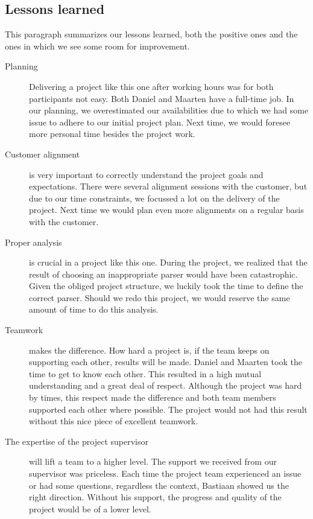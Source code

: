 
\subsection{Lessons learned}
\label{assessment:lessons-learned}
This paragraph summarizes our lessons learned, both the positive ones and the ones in which we see some room for improvement.

  \begin{description}	  
    \item[Planning] Delivering a project like this one after working hours was for both participants not easy. 
	  Both Daniel and Maarten have a full-time job.
	  In our planning, we overestimated our availabilities due to which we had some issue to adhere to our initial project plan.
	  Next time, we would foresee more personal time besides the project work.
	
    \item[Customer alignment] is very important to correctly understand the project goals and expectations.
	  There were several alignment sessions with the customer, but due to our time constraints, we focussed  a lot on the delivery of the project. 
	  Next time we would plan even more alignments on a regular basis with the customer.	  
    
    \item[Proper analysis] is crucial in a project like this one.
	  During the project, we realized that the result of choosing an inappropriate parser would have been catastrophic.
	  Given the obliged project structure, we luckily took the time to define the correct parser.
      Should we redo this project, we would reserve the same amount of time to do this analysis.
    
    \item[Teamwork] makes the difference.
	  How hard a project is, if the team keeps on supporting each other, results will be made.
	  Daniel and Maarten took the time to get to know each other.
	  This resulted in a high mutual understanding and a great deal of respect.
	  Although the project was hard by times, this respect made the difference and both team members supported each other where possible.
	  The project would not had this result without this nice piece of excellent teamwork.
	 
	 \item[The expertise of the project supervisor] will lift a team to a higher level.
	  The support we received from our supervisor was priceless.
	  Each time the project team experienced an issue or had some questions, regardless the context, Bastiaan showed us the right direction.
	  Without his support, the progress and quality of the project would be of a lower level.
	  
	  
  \end{description}

